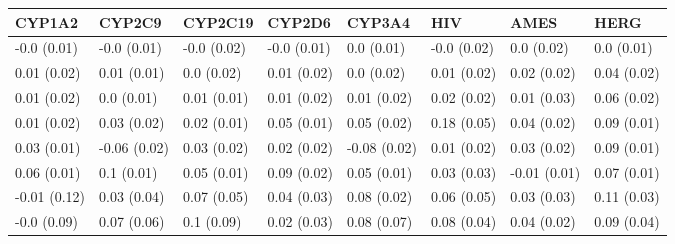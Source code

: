 \begin{tabular}{llllllll}
\toprule
CYP1A2 & CYP2C9 & CYP2C19 & CYP2D6 & CYP3A4 & HIV & AMES & HERG \\
\midrule
-0.0 (0.01) & -0.0 (0.01) & -0.0 (0.02) & -0.0 (0.01) & 0.0 (0.01) & -0.0 (0.02) & 0.0 (0.02) & 0.0 (0.01) \\
0.01 (0.02) & 0.01 (0.01) & 0.0 (0.02) & 0.01 (0.02) & 0.0 (0.02) & 0.01 (0.02) & 0.02 (0.02) & 0.04 (0.02) \\
0.01 (0.02) & 0.0 (0.01) & 0.01 (0.01) & 0.01 (0.02) & 0.01 (0.02) & 0.02 (0.02) & 0.01 (0.03) & 0.06 (0.02) \\
0.01 (0.02) & 0.03 (0.02) & 0.02 (0.01) & 0.05 (0.01) & 0.05 (0.02) & 0.18 (0.05) & 0.04 (0.02) & 0.09 (0.01) \\
0.03 (0.01) & -0.06 (0.02) & 0.03 (0.02) & 0.02 (0.02) & -0.08 (0.02) & 0.01 (0.02) & 0.03 (0.02) & 0.09 (0.01) \\
0.06 (0.01) & 0.1 (0.01) & 0.05 (0.01) & 0.09 (0.02) & 0.05 (0.01) & 0.03 (0.03) & -0.01 (0.01) & 0.07 (0.01) \\
-0.01 (0.12) & 0.03 (0.04) & 0.07 (0.05) & 0.04 (0.03) & 0.08 (0.02) & 0.06 (0.05) & 0.03 (0.03) & 0.11 (0.03) \\
-0.0 (0.09) & 0.07 (0.06) & 0.1 (0.09) & 0.02 (0.03) & 0.08 (0.07) & 0.08 (0.04) & 0.04 (0.02) & 0.09 (0.04) \\
\bottomrule
\end{tabular}
